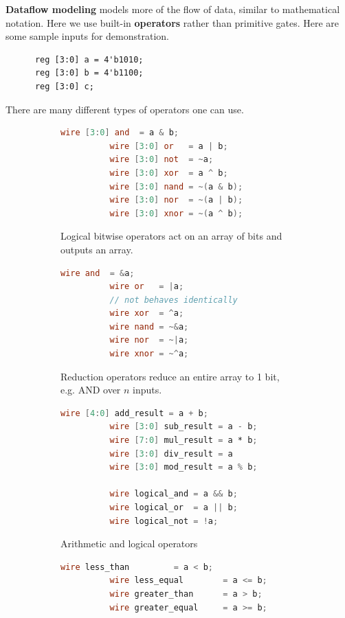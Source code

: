  \begin{definition}
    \textbf{Dataflow modeling} models more of the flow of data, similar to mathematical notation. Here we use built-in \textbf{operators} rather than primitive gates. Here are some sample inputs for demonstration.
    \begin{lstlisting}
      reg [3:0] a = 4'b1010;
      reg [3:0] b = 4'b1100;
      reg [3:0] c;
    \end{lstlisting}
    There are many different types of operators one can use. 

    \begin{figure}[H]
      \centering
      \begin{subfigure}[b]{0.48\textwidth}
        \centering
        \begin{lstlisting}[language=Verilog]
          wire [3:0] and  = a & b;   
          wire [3:0] or   = a | b;   
          wire [3:0] not  = ~a;      
          wire [3:0] xor  = a ^ b;   
          wire [3:0] nand = ~(a & b);
          wire [3:0] nor  = ~(a | b);
          wire [3:0] xnor = ~(a ^ b);
        \end{lstlisting}
        \caption{Logical bitwise operators act on an array of bits and outputs an array.} 
      \end{subfigure}
      \hfill 
      \begin{subfigure}[b]{0.48\textwidth}
        \centering
        \begin{lstlisting}[language=Verilog]
          wire and  = &a;    
          wire or   = |a;    
          // not behaves identically
          wire xor  = ^a;    
          wire nand = ~&a;   
          wire nor  = ~|a;   
          wire xnor = ~^a;   
        \end{lstlisting}
        \caption{Reduction operators reduce an entire array to 1 bit, e.g. AND over $n$ inputs.}
      \end{subfigure}

      \begin{subfigure}[b]{0.48\textwidth}
        \centering
        \begin{lstlisting}[language=Verilog]
          wire [4:0] add_result = a + b;    
          wire [3:0] sub_result = a - b;    
          wire [7:0] mul_result = a * b;    
          wire [3:0] div_result = a 
          wire [3:0] mod_result = a % b;    

          wire logical_and = a && b;  
          wire logical_or  = a || b;  
          wire logical_not = !a;      
        \end{lstlisting}
        \caption{Arithmetic and logical operators}
      \end{subfigure}
      \hfill 
      \begin{subfigure}[b]{0.48\textwidth}
        \centering
        \begin{lstlisting}[language=Verilog]
          wire less_than         = a < b;   
          wire less_equal        = a <= b;  
          wire greater_than      = a > b;   
          wire greater_equal     = a >= b;  


\end{lstlisting}
\end{subfigure}
\end{figure}
\end{definition}
